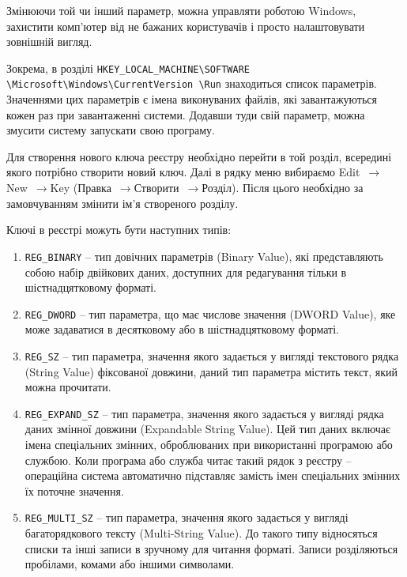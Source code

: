 \documentclass[
	a4paper,
	oneside,
	DIV = 12,
	fontsize = 13pt,
	headings = normal,
]{scrartcl}
\newcommand{\Mytextrightarrow}{$\rightarrow$\hspace{0.25em}}
\newcommand{\regkey}[1]{\texttt{\textenglish{#1}}}
\begin{document}
		Змінюючи той чи інший параметр, можна управляти роботою Windows, захистити комп'ютер від не бажаних користувачів і просто налаштовувати зовнішній вигляд. 

		Зокрема, в розділі \regkey{HKEY\_LOCAL\_MACHINE\textbackslash{}\-SOFTWARE \textbackslash{}\-Microsoft\textbackslash{}\-Windows\textbackslash{}\-CurrentVersion \textbackslash{}\-Run} знаходиться список параметрів. Значеннями цих параметрів є імена виконуваних файлів, які завантажуються кожен раз при завантаженні системи. Додавши туди свій параметр, можна змусити систему запускати свою програму.

		Для створення нового ключа реєстру необхідно перейти в той розділ, всередині якого потрібно створити новий ключ. Далі в рядку меню вибираємо Edit~\Mytextrightarrow New~\Mytextrightarrow Key (Правка~\Mytextrightarrow Створити~\Mytextrightarrow Розділ). Після цього необхідно за замовчуванням змінити ім'я створеного розділу.

		Ключі в реєстрі можуть бути наступних типів:
		\begin{enumerate}
			\item \regkey{REG\_BINARY} – тип довічних параметрів (Binary Value), які представляють собою набір двійкових даних, доступних для редагування тільки в шістнадцятковому форматі. 

			\item \regkey{REG\_DWORD} – тип параметра, що має числове значення (DWORD Value), яке може задаватися в десятковому або в шістнадцятковому форматі. 

			\item \regkey{REG\_SZ} – тип параметра, значення якого задається у вигляді текстового рядка (String Value) фіксованої довжини, даний тип параметра містить текст, який можна прочитати. 

			\item \regkey{REG\_EXPAND\_SZ} – тип параметра, значення якого задається у вигляді рядка даних змінної довжини (Expandable String Value). Цей тип даних включає імена спеціальних змінних, оброблюваних при використанні програмою або службою. Коли програма або служба читає такий рядок з реєстру – операційна система автоматично підставляє замість імен спеціальних змінних їх поточне значення. 

			\item \regkey{REG\_MULTI\_SZ} – тип параметра, значення якого задається у вигляді багаторядкового тексту (Multi-String Value). До такого типу відносяться списки та інші записи в зручному для читання форматі. Записи розділяються пробілами, комами або іншими символами.
		\end{enumerate}
\end{document}
